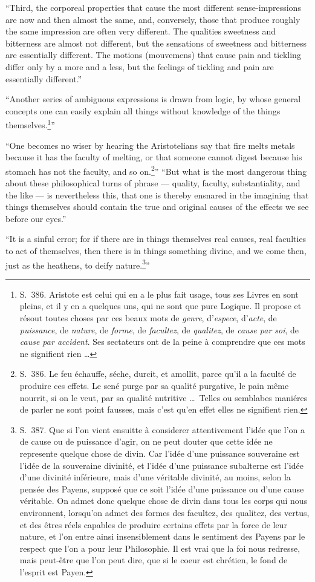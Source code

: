 \documentclass[12pt,a4paper]{article}
\begin{document}
``Third, the corporeal properties that cause the most different sense-impressions
are now and then almost the same, and, conversely, those that produce roughly the
same impression are often very different. The qualities sweetness and bitterness
are almost not different, but the sensations of sweetness and bitterness are
essentially different. The motions (mouvemens) that cause pain and tickling differ
only by a more and a less, but the feelings of tickling and pain are essentially
different.''

``Another series of ambiguous expressions is drawn from logic, by whose general
concepts one can easily explain all things without knowledge of the things
themselves.\footnote{S.~386. Aristote est celui qui en a le plus fait usage, tous
ses Livres en sont pleins, et il y en a quelques uns, qui ne sont que pure
Logique. Il propose et résout toutes choses par ces beaux mots de \emph{genre},
d'\emph{espece}, d'\emph{acte}, de \emph{puissance}, de \emph{nature}, de
\emph{forme}, de \emph{facultez}, de \emph{qualitez}, de \emph{cause par soi}, de
\emph{cause par accident}. Ses sectateurs ont de la peine à comprendre que ces
mots ne signifient rien \dots}''

``One becomes no wiser by hearing the Aristotelians say that fire melts metals
because it has the faculty of melting, or that someone cannot digest because his
stomach has not the faculty, and so on.\footnote{S.~386. Le feu échauffe, séche,
durcit, et amollit, parce qu'il a la faculté de produire ces effets. Le sené purge
par sa qualité purgative, le pain même nourrit, si on le veut, par sa qualité
nutritive \dots\ Telles ou semblabes maniéres de parler ne sont point fausses,
mais c'est qu'en effet elles ne signifient rien.}''
``But what is the most dangerous thing about these philosophical turns of phrase
--- quality, faculty, substantiality, and the like --- is nevertheless this, that
one is thereby ensnared in the imagining that things themselves should contain the
true and original causes of the effects we see before our eyes.''

``It is a sinful error; for if there are in things themselves real causes, real
faculties to act of themselves, then there is in things something divine, and we
come then, just as the heathens, to deify nature.\footnote{S.~387. Que si l'on
vient ensuitte à considerer attentivement l'idée que l'on a de cause ou de
puissance d'agir, on ne peut douter que cette idée ne represente quelque chose de
divin. Car l'idée d'une puissance souveraine est l'idée de la souveraine divinité,
et l'idée d'une puissance subalterne est l'idée d'une divinité inférieure, mais
d'une véritable divinité, au moins, selon la pensée des Payens, supposé que ce
soit l'idée d'une puissance ou d'une cause véritable. On admet donc quelque chose
de divin dans tous les corps qui nous environnent, lorsqu'on admet des formes des
facultez, des qualitez, des vertus, et des êtres réels capables de produire
certains effets par la force de leur nature, et l'on entre ainsi insensiblement
dans le sentiment des Payens par le respect que l'on a pour leur Philosophie. Il
est vrai que la foi nous redresse, mais peut-être que l'on peut dire, que si le
coeur est chrétien, le fond de l'esprit est Payen.}''
\end{document}
